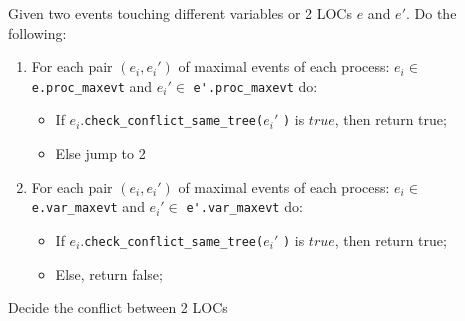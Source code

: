 \documentclass{llncs}
\begin{document}
\begin{algorithm}
	Given two events touching different variables or 2 LOCs $e$ and $e'$.
	Do the following:
	\begin{enumerate}
		\item
		For each pair $(e_i, e_i')$ of maximal events of each process:
		$e_i \in$ \verb!e.proc_maxevt! and $e_i' \in$ \verb!e'.proc_maxevt! do: \\
		\begin{itemize}
			\item
			If $e_i$.\verb!check_conflict_same_tree(!$e_i'$ \verb!)! is $true$, then  return true;
			\item
			Else jump to 2
		\end{itemize}
		
		\item
		For each pair $(e_i, e_i')$ of maximal events of each process:
		$e_i \in $ \verb!e.var_maxevt! and $e_i' \in$ \verb!e'.var_maxevt! do:\\
		\begin{itemize}
			\item
			If $e_i$.\verb!check_conflict_same_tree(!$e_i'$ \verb!)! is $true$, then  return true;
			\item
			Else, return false;
		\end{itemize}
		
	\end{enumerate}
	\caption{Decide the conflict between 2 LOCs}
	\label{a:arb}	
\end{algorithm}
\end{document}
